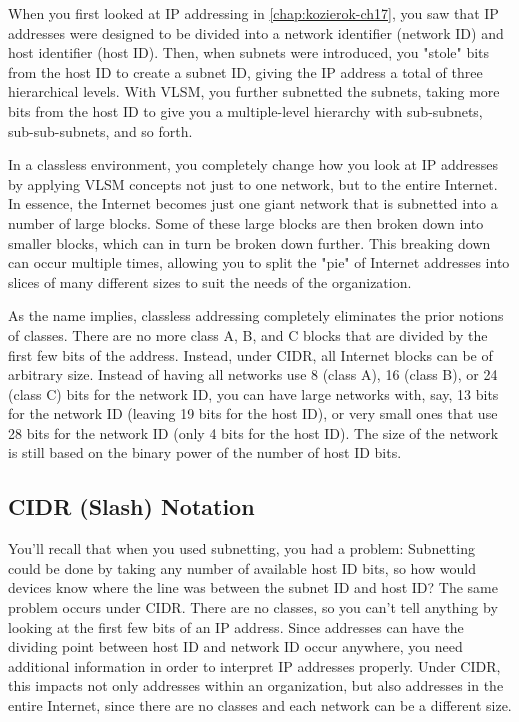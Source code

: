 \documentclass[b5paper,11pt]{memoir}
\begin{document}
When you first looked at IP addressing in
\cref{chap:kozierok-ch17}, you saw that IP addresses
were designed to be divided into a network identifier (network ID) and
host identifier (host ID). Then, when subnets were introduced, you
"stole" bits from the host ID to create a subnet ID, giving the IP
address a total of three
\protect\hypertarget{ch20s02.htmlux5cux23idx-CHP-20-0761}{}{}hierarchical
levels. With VLSM, you further subnetted the subnets, taking more bits
from the host ID to give you a multiple-level hierarchy with
sub-subnets, sub-sub-subnets, and so forth.

In a classless environment, you completely change how you look at IP
addresses by applying VLSM concepts not just to one network, but to the
entire Internet. In essence, the Internet becomes just one giant network
that is subnetted into a number of large blocks. Some of these large
blocks are then broken down into smaller blocks, which can in turn be
broken down further. This breaking down can occur multiple times,
allowing you to split the "pie" of Internet addresses into slices of
many different sizes to suit the needs of the organization.

As the name implies, classless addressing completely eliminates the
prior notions of classes. There are no more class A, B, and C blocks
that are divided by the first few bits of the address. Instead, under
\protect\hypertarget{ch20s02.htmlux5cux23idx-CHP-20-0762}{}{}CIDR, all
Internet blocks can be of arbitrary size. Instead of having all networks
use 8 (class A), 16 (class B), or 24 (class C) bits for the network ID,
you can have large networks with, say, 13 bits for the network ID
(leaving 19 bits for the host ID), or very small ones that use 28 bits
for the network ID (only 4 bits for the host ID). The size of the
network is still based on the binary power of the number of host ID
bits.

\subsection[CIDR (Slash)
Notation]{\texorpdfstring{\protect\hypertarget{ch20s02.htmlux5cux23cidr_slash_notation}{}{}CIDR
(Slash) Notation}{CIDR (Slash) Notation}}

\protect\hypertarget{ch20s02.htmlux5cux23idx-CHP-20-0763}{}{}\protect\hypertarget{ch20s02.htmlux5cux23idx-CHP-20-0764}{}{}You'll
recall that when you used subnetting, you had a problem: Subnetting
could be done by taking any number of available host ID bits, so how
would devices know where the line was between the subnet ID and host ID?
The same problem occurs under CIDR. There are no classes, so you can't
tell anything by looking at the first few bits of an IP address. Since
addresses can have the dividing point between host ID and network ID
occur anywhere, you need additional information in order to interpret IP
addresses properly. Under CIDR, this impacts not only addresses within
an organization, but also addresses in the entire Internet, since there
are no classes and each network can be a different size.
\end{document}
